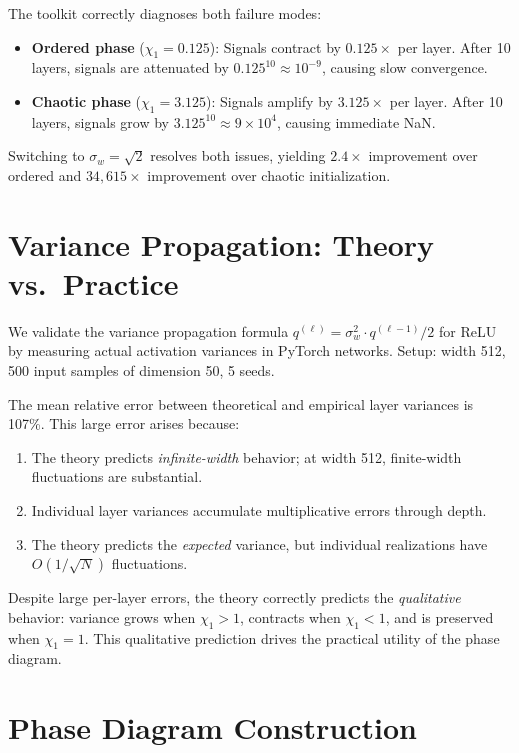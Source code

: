 \documentclass[10pt]{article}
\theoremstyle{definition}
\begin{document}
The toolkit correctly diagnoses both failure modes:
\begin{itemize}[nosep]
  \item \textbf{Ordered phase} ($\chi_1 = 0.125$): Signals contract by $0.125\times$ per layer. After 10 layers, signals are attenuated by $0.125^{10} \approx 10^{-9}$, causing slow convergence.
  \item \textbf{Chaotic phase} ($\chi_1 = 3.125$): Signals amplify by $3.125\times$ per layer. After 10 layers, signals grow by $3.125^{10} \approx 9 \times 10^4$, causing immediate NaN.
\end{itemize}
Switching to $\sigma_w = \sqrt{2}$ resolves both issues, yielding $2.4\times$ improvement over ordered and $34{,}615\times$ improvement over chaotic initialization.

\section{Variance Propagation: Theory vs.\ Practice}
\label{sec:variance}

We validate the variance propagation formula $q^{(\ell)} = \sigma_w^2 \cdot q^{(\ell-1)}/2$ for ReLU by measuring actual activation variances in PyTorch networks.
Setup: width 512, 500 input samples of dimension 50, 5 seeds.

The mean relative error between theoretical and empirical layer variances is 107\%.
This large error arises because:
\begin{enumerate}[nosep]
  \item The theory predicts \emph{infinite-width} behavior; at width 512, finite-width fluctuations are substantial.
  \item Individual layer variances accumulate multiplicative errors through depth.
  \item The theory predicts the \emph{expected} variance, but individual realizations have $O(1/\sqrt{N})$ fluctuations.
\end{enumerate}

Despite large per-layer errors, the theory correctly predicts the \emph{qualitative} behavior: variance grows when $\chi_1 > 1$, contracts when $\chi_1 < 1$, and is preserved when $\chi_1 = 1$.
This qualitative prediction drives the practical utility of the phase diagram.

\section{Phase Diagram Construction}
\label{sec:phase-diagram}
\end{document}
